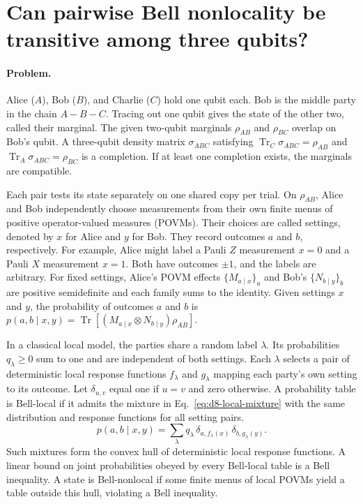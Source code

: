 \section{Can pairwise Bell nonlocality be transitive among three qubits?}
\label{sec:op_b42a403999364c59}

\paragraph{Problem.}
Alice ($A$), Bob ($B$), and Charlie ($C$) hold one qubit each. Bob is the middle party in the chain $A\!-\!B\!-\!C$. Tracing out one qubit gives the state of the other two, called their marginal. The given two-qubit marginals $\rho_{AB}$ and $\rho_{BC}$ overlap on Bob's qubit. A three-qubit density matrix $\sigma_{ABC}$ satisfying $\operatorname{Tr}_C\sigma_{ABC}=\rho_{AB}$ and $\operatorname{Tr}_A\sigma_{ABC}=\rho_{BC}$ is a completion. If at least one completion exists, the marginals are compatible.

Each pair tests its state separately on one shared copy per trial. On $\rho_{AB}$, Alice and Bob independently choose measurements from their own finite menus of positive operator-valued measures (POVMs). Their choices are called settings, denoted by $x$ for Alice and $y$ for Bob. They record outcomes $a$ and $b$, respectively. For example, Alice might label a Pauli $Z$ measurement $x=0$ and a Pauli $X$ measurement $x=1$. Both have outcomes $\pm1$, and the labels are arbitrary. For fixed settings, Alice's POVM effects $\{M_{a\mid x}\}_a$ and Bob's $\{N_{b\mid y}\}_b$ are positive semidefinite and each family sums to the identity. Given settings $x$ and $y$, the probability of outcomes $a$ and $b$ is $p(a,b\mid x,y)=\operatorname{Tr}[(M_{a\mid x}\otimes N_{b\mid y})\rho_{AB}]$.

In a classical local model, the parties share a random label $\lambda$. Its probabilities $q_\lambda\ge 0$ sum to one and are independent of both settings. Each $\lambda$ selects a pair of deterministic local response functions $f_\lambda$ and $g_\lambda$ mapping each party's own setting to its outcome. Let $\delta_{u,v}$ equal one if $u=v$ and zero otherwise. A probability table is Bell-local if it admits the mixture in Eq.~\eqref{eq:d8-local-mixture} with the same distribution and response functions for all setting pairs.
\begin{equation}
p(a,b\mid x,y)=\sum_{\lambda}q_\lambda\,\delta_{a,f_\lambda(x)}\,\delta_{b,g_\lambda(y)}.
\label{eq:d8-local-mixture}
\end{equation}
Such mixtures form the convex hull of deterministic local response functions. A linear bound on joint probabilities obeyed by every Bell-local table is a Bell inequality. A state is Bell-nonlocal if some finite menus of local POVMs yield a table outside this hull, violating a Bell inequality.

